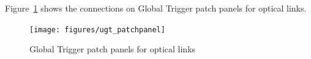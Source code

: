 
Figure~\ref{fig:app:ugt_pp} shows the connections on Global Trigger patch panels for optical links.

\begin{figure}[htb]
\centering
\texttt{[image: figures/ugt\_patchpanel]}
\caption{Global Trigger patch panels for optical links}
\label{fig:app:ugt_pp}
\end{figure}


